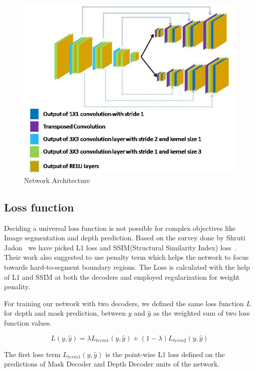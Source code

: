 \documentclass[review]{cvpr}
\begin{document}
\begin{figure}
\centering
  \includegraphics[width=1.0\linewidth]{networkarchitecture.jpg}
  \caption{Network Architecture}
  \label{fig:modelarch}
\end{figure}

\subsection{Loss function}
Deciding a universal loss function is not possible for complex objectives like Image segmentation and depth prediction. Based on the survey done by Shruti Jadon~\cite{jadon2020survey} we have picked L1 loss and SSIM(Structural Similarity Index) loss~\cite{zhao2015loss}. Their work also suggested to use penalty term which helps the network to focus towards hard-to-segment boundary regions. The Loss is calculated with the help of L1 and SSIM at both the decoders and employed regularization for weight penality.

For training our network with two decoders, we defined the same loss function $L$ for depth and mask prediction, between $y$ and $\hat{y}$ as the weighted sum of two loss function values.

\begin{equation}
L(y, \hat{y}) = \lambda L_{term1}(y, \hat{y}) + (1 - \lambda) L_{term2}(y, \hat{y})
\end{equation}

The first loss term $L_{term1}(y, \hat{y})$ is the point-wise L1 loss defined on the predictions of Mask Decoder and  
Depth Decoder units of the network.
\end{document}
